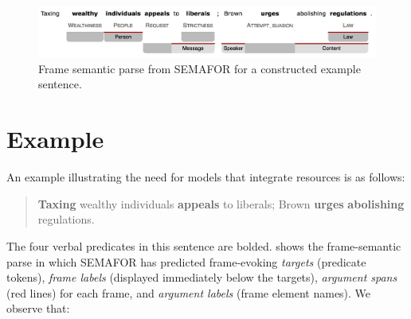 \documentclass[11pt]{article}
\newcommand{\ensuretext}[1]{#1}
\newcommand{\nssmarker}{\ensuretext{\textcolor{magenta}{\ensuremath{^{\textsc{NS}}_{\textsc{S}}}}}}
\newcommand{\arkcomment}[3]{\ensuretext{\textcolor{#3}{[#1 #2]}}}
\newcommand{\nss}[1]{\arkcomment{\nssmarker}{#1}{magenta}}
\newcommand{\vpred}[1]{\textbf{#1}} %
\begin{document}
\begin{figure}\centering
\includegraphics[width=.8\textwidth]{tax_example_short.jpg}
\caption{Frame semantic parse from SEMAFOR for a constructed example sentence.}
\label{fig:semaforOutput}
\end{figure}


\section{Example}\label{sec:example}

An example illustrating the need for models that integrate resources is as follows:
\begin{quote}
\vpred{Taxing} wealthy individuals \vpred{appeals} to liberals; Brown \vpred{urges} \vpred{abolishing} regulations.
\end{quote}
The four verbal predicates in this sentence are bolded. %
 shows the frame-semantic parse in which SEMAFOR 
has predicted frame-evoking \emph{targets} (predicate tokens), 
\emph{frame labels} (displayed immediately below the targets), 
\emph{argument spans} (red lines) for each frame, and 
\emph{argument labels} (frame element names).
We observe that:
\end{document}
